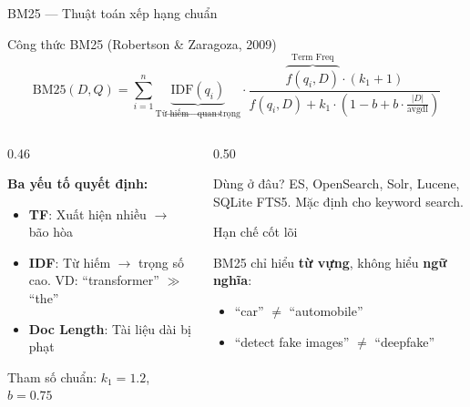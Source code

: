 \documentclass[aspectratio=169, 11pt]{beamer}
\begin{document}
\begin{frame}[fragile]{BM25 --- Thuật toán xếp hạng chuẩn}

\begin{block}{Công thức BM25 {\scriptsize (Robertson \& Zaragoza, 2009)}}
\vspace{-0.15cm}
\[
\text{BM25}(D, Q) = \sum_{i=1}^{n} \underbrace{\text{IDF}(q_i)}_{\text{Từ hiếm}\to\text{quan trọng}} \cdot \frac{\overbrace{f(q_i, D)}^{\text{Term Freq}} \cdot (k_1 + 1)}{f(q_i, D) + k_1 \cdot \left(1 - b + b \cdot \frac{|D|}{\text{avgdl}}\right)}
\]
\vspace{-0.15cm}
\end{block}

\begin{columns}[T]
\begin{column}{0.46\textwidth}
{\scriptsize
\textbf{Ba yếu tố quyết định:}
\begin{itemize}
    \item \textcolor{accentBlue}{\textbf{TF}}: Xuất hiện nhiều $\to$ bão hòa
    \item \textcolor{accentOrange}{\textbf{IDF}}: Từ hiếm $\to$ trọng số cao. VD: ``transformer'' $\gg$ ``the''
    \item \textcolor{accentPurple}{\textbf{Doc Length}}: Tài liệu dài bị phạt
\end{itemize}
Tham số chuẩn: $k_1 = 1.2$, $b = 0.75$
}
\end{column}
\begin{column}{0.50\textwidth}

\begin{exampleblock}{Dùng ở đâu?}
{\scriptsize ES, OpenSearch, Solr, Lucene, SQLite FTS5. Mặc định cho keyword search.}
\end{exampleblock}

\begin{alertblock}{Hạn chế cốt lõi}
{\scriptsize BM25 chỉ hiểu \textbf{từ vựng}, không hiểu \textbf{ngữ nghĩa}:
\begin{itemize}
    \item ``car'' $\neq$ ``automobile''
    \item ``detect fake images'' $\neq$ ``deepfake''
\end{itemize}
}
\end{alertblock}
\end{column}
\end{columns}
\end{frame}

\end{document}
